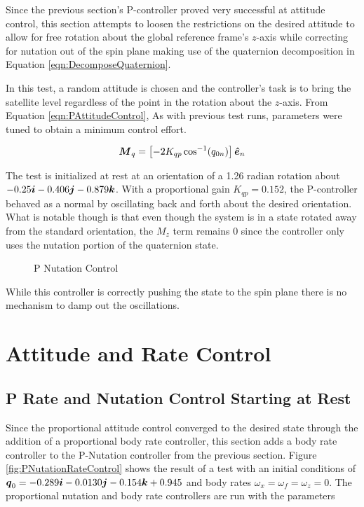 Since the previous section's P-controller proved very successful at attitude control, this section attempts to loosen the restrictions on the desired attitude to allow for free rotation about the global reference frame's $z$-axis while correcting for nutation out of the spin plane making use of the quaternion decomposition in Equation \ref{eqn:DecomposeQuaternion}.

In this test, a random attitude is chosen and the controller's task is to bring the satellite level regardless of the point in the rotation about the $z$-axis.  From Equation \ref{eqn:PAttitudeControl},    As with previous test runs, parameters were tuned to obtain a minimum control effort.

\begin{equation}
  \boldsymbol{M}_{q} = \left[-2 K_{qp} \cos^{-1} (q_{0n}) \right] \boldsymbol{\hat{e}}_n
  \label{eqn:PNutationControl}
\end{equation}


The test is initialized at rest at an orientation of a 1.26 radian rotation about $-0.25 \boldsymbol{i} -0.406\boldsymbol{j} -0.879\boldsymbol{k}$.  With a proportional gain $K_{qp} = 0.152$, the P-controller behaved as a normal by oscillating back and forth about the desired orientation.  What is notable though is that even though the system is in a state rotated away from the standard orientation, the $M_z$ term remains 0 since the controller only uses the nutation portion of the quaternion state.

\begin{figure}[H]
  \centerline{}
  \caption{P Nutation Control}
  \label{fig:PNutationControl}
\end{figure}

While this controller is correctly pushing the state to the spin plane there is no mechanism to damp out the oscillations.

\section{Attitude and Rate Control}
\label{sec:AttitudeandRateControl}

\subsection{P Rate and Nutation Control Starting at Rest}
\label{subsec:PRateNutationControlStartingatRest}

Since the proportional attitude control converged to the desired state through the addition of a proportional body rate controller, this section adds a body rate controller to the P-Nutation controller from the previous section.  Figure \ref{fig:PNutationRateControl} shows the result of a test with an initial conditions of $\boldsymbol{q}_0 = -0.289\boldsymbol{i} -0.0130 \boldsymbol{j} -0.154 \boldsymbol{k} + 0.945$ and body rates $\omega_x = \omega_f = \omega_z = 0$.  The proportional nutation and body rate controllers are run with the parameters

